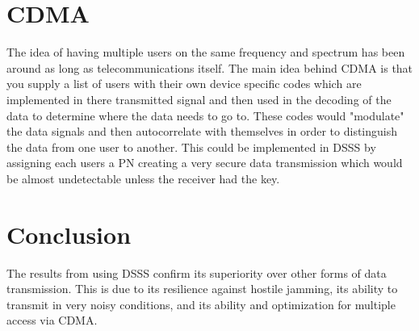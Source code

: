 \documentclass[journal]{IEEEtran}
\begin{document}
\section{CDMA}
The idea of having multiple users on the same frequency and spectrum has been around as long as telecommunications itself. The main idea behind CDMA is that you supply a list of users with their own device specific codes which are implemented in there transmitted signal and then used in the decoding of the data to determine where the data needs to go to. These codes would "modulate" the data signals and then autocorrelate with themselves in order to distinguish the data from one user to another. This could be implemented in DSSS by assigning each users a PN creating a very secure data transmission which would be almost undetectable unless the receiver had the key.

\section{Conclusion}
The results from using DSSS confirm its superiority over other forms of data transmission. This is due to its resilience against hostile jamming, its ability to transmit in very noisy conditions, and its ability and optimization for multiple access via CDMA.  
\end{document}
